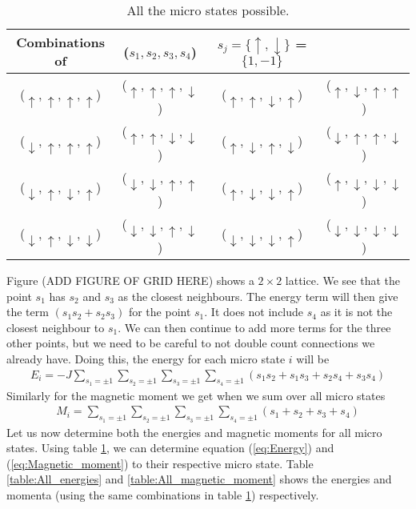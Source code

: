 \documentclass[12pt]{article}
\begin{document}
\begin{table}
\begin{center}
	\begin{tabular}{c c c c}
	Combinations of & ($s_1, s_2, s_3, s_4$)& $s_j = \lbrace \uparrow, \downarrow \rbrace$  = $\lbrace 1, -1 \rbrace$ &\\
	\hline 
	($\uparrow , \uparrow, \uparrow, \uparrow$) & 
	($\uparrow , \uparrow, \uparrow, \downarrow$) & 
	($\uparrow , \uparrow, \downarrow, \uparrow$)  & 
	($\uparrow , \downarrow, \uparrow, \uparrow$) \\
	($\downarrow , \uparrow, \uparrow, \uparrow$)& ($\uparrow, \uparrow, \downarrow, \downarrow$) & ($\uparrow, \downarrow, \uparrow, \downarrow$) & ($\downarrow, \uparrow, \uparrow, \downarrow$) \\
	($\downarrow, \uparrow, \downarrow, \uparrow$)& ($\downarrow, \downarrow, \uparrow, \uparrow$) & ($\uparrow, \downarrow, \downarrow, \uparrow$) & ($\uparrow, \downarrow, \downarrow, \downarrow$) \\
	($\downarrow, \uparrow, \downarrow, \downarrow$) & ($\downarrow, \downarrow, \uparrow, \downarrow$) & ($\downarrow, \downarrow, \downarrow, \uparrow$) & ($\downarrow, \downarrow, \downarrow, \downarrow$) \\
	\hline
	\end{tabular}
\caption{All the micro states possible.}
\label{table:All_microstates}
\end{center}
\end{table}

Figure (ADD FIGURE OF GRID HERE) shows a $2\times2$ lattice. We see that the point $s_1$ has $s_2$ and $s_3$ as the closest neighbours. The energy term will then give the term $(s_1s_2 + s_2s_3)$ for the point $s_1$. It does not include $s_4$ as it is not the closest neighbour to $s_1$. We can then continue to add more terms for the three other points, but we need to be careful to not double count connections we already have. Doing this, the energy for each micro state $i$ will be
\begin{align}
E_i = -J\displaystyle \sum_{s_1 = \pm1} \sum_{s_2 = \pm1} \sum_{s_3 = \pm1} \sum_{s_4 = \pm1}(s_1s_2 + s_1s_3 + s_2s_4 + s_3s_4)
\label{eq:Energy}
\end{align}
Similarly for the magnetic moment we get when we sum over all micro states 
\begin{align}
M_i = \displaystyle \sum_{s_1 = \pm1} \sum_{s_2 = \pm1} \sum_{s_3 = \pm1} \sum_{s_4 = \pm1} (s_1 + s_2 + s_3 + s_4)
\label{eq:Magnetic_moment}
\end{align}
Let us now determine both the energies and magnetic moments for all micro states. Using table \ref{table:All_microstates}, we can determine equation (\ref{eq:Energy}) and (\ref{eq:Magnetic_moment}) to their respective micro state. Table \ref{table:All_energies} and \ref{table:All_magnetic_moment} shows the energies and momenta (using the same combinations in table \ref{table:All_microstates}) respectively.
\end{document}
